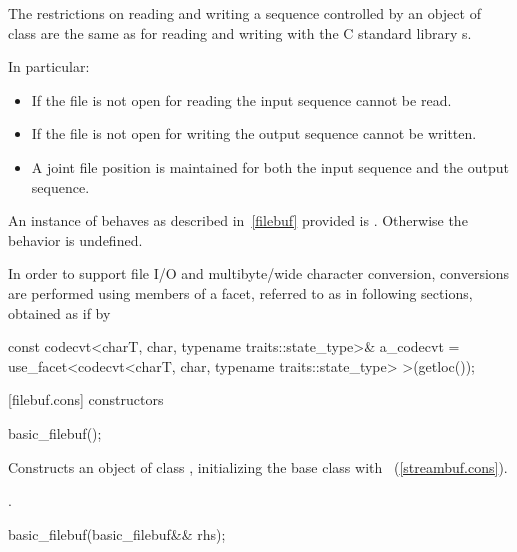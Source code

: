 \pnum
The restrictions on reading and writing a sequence controlled by an
object of class
are the same as for reading and writing with the C standard library
s.

\pnum
In particular:
\begin{itemize}
\item
If the file is not open for reading the input sequence
cannot be read.
\item
If the file is not open for writing the output
sequence cannot be written.
\item
A joint file position is maintained for both the input sequence and
the output sequence.
\end{itemize}

\pnum
An instance of
behaves as described in~\ref{filebuf} provided
is
.
Otherwise the behavior is undefined.

\pnum
In order to support file I/O and multibyte/wide character conversion,
conversions are performed using members of a facet, referred to as
 in following sections, obtained as if by

\begin{codeblock}
const codecvt<charT, char, typename traits::state_type>& a_codecvt =
  use_facet<codecvt<charT, char, typename traits::state_type> >(getloc());
\end{codeblock}

[filebuf.cons]{ constructors}

%
\begin{itemdecl}
basic_filebuf();
\end{itemdecl}

\begin{itemdescr}
\pnum
\effects
Constructs an object of class
,
initializing the base class with
~(\ref{streambuf.cons}).

\pnum
\postcondition
{}.
\end{itemdescr}

%
\begin{itemdecl}
basic_filebuf(basic_filebuf&& rhs);
\end{itemdecl}

